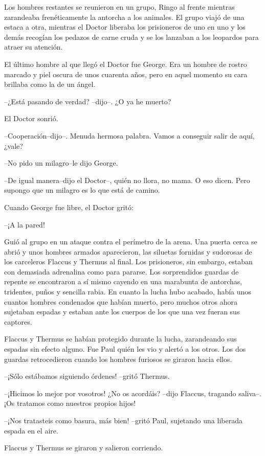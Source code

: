 Los hombres restantes se reunieron en un grupo, Ringo al frente mientras
zarandeaba frenéticamente la antorcha a los animales. El grupo viajó de
una estaca a otra, mientras el Doctor liberaba los prisioneros de uno en
uno y los demás recogían los pedazos de carne cruda y se los lanzaban a
los leopardos para atraer su atención.

El último hombre al que llegó el Doctor fue George. Era un hombre de
rostro marcado y piel oscura de unos cuarenta años, pero en aquel
momento su cara brillaba como la de un ángel.

--¿Está pasando de verdad? --dijo--. ¿O ya he muerto?

El Doctor sonrió.

--Cooperación--dijo--. Menuda hermosa palabra. Vamos a conseguir salir
de aquí, ¿vale?

--No pido un milagro--le dijo George.

--De igual manera--dijo el Doctor--, quién no llora, no mama. O eso
dicen. Pero supongo que un milagro es lo que está de camino.

Cuando George fue libre, el Doctor gritó:

--¡A la pared!

Guió al grupo en un ataque contra el perímetro de la arena. Una puerta
cerca se abrió y unos hombres armados aparecieron, las siluetas fornidas
y sudorosas de los carceleros Flaccus y Thermus al final. Los
prisioneros, sin embargo, estaban con demasiada adrenalina como para
pararse. Los sorprendidos guardas de repente se encontraron a sí mismo
cayendo en una marabunta de antorchas, tridentes, puños y sencilla
rabia. En cuanto la lucha hubo acabado, había unos cuantos hombres
condenados que habían muerto, pero muchos otros ahora sujetaban espadas
y estaban ante los cuerpos de los que una vez fueran sus captores.

Flaccus y Thermus se habían protegido durante la lucha, zarandeando sus
espadas sin efecto alguno. Fue Paul quién les vio y alertó a los otros.
Los dos guardas retrocedieron cuando los hombres furiosos se giraron
hacia ellos.

--¡Sólo estábamos siguiendo órdenes! --gritó Thermus.

--¡Hicimos lo mejor por vosotros! ¿No os acordáis? --dijo Flaccus,
tragando saliva--. ¡Os tratamos como nuestros propios hijos!

--¡Nos tratasteis como basura, más bien! --gritó Paul, sujetando una
liberada espada en el aire.

Flaccus y Thermus se giraron y salieron corriendo.

